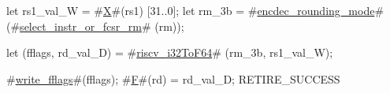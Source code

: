 let rs1_val_W = #\hyperref[sailRISCVzX]{X}#(rs1) [31..0];
let rm_3b     = #\hyperref[sailRISCVzencdeczyroundingzymode]{encdec\_rounding\_mode}# (#\hyperref[sailRISCVzselectzyinstrzyorzyfcsrzyrm]{select\_instr\_or\_fcsr\_rm}#  (rm));

let (fflags, rd_val_D) = #\hyperref[sailRISCVzriscvzyi32ToF64]{riscv\_i32ToF64}# (rm_3b, rs1_val_W);

#\hyperref[sailRISCVzwritezyfflags]{write\_fflags}#(fflags);
#\hyperref[sailRISCVzF]{F}#(rd) = rd_val_D;
RETIRE_SUCCESS
